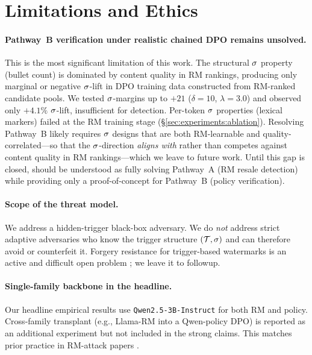 \section{Limitations and Ethics}
\label{sec:limitations}

\paragraph{Pathway~B verification under realistic chained DPO
remains unsolved.}
This is the most significant limitation of this work.
The structural $\sigma$ property (bullet count) is dominated
by content quality in RM rankings, producing only marginal or
negative $\sigma$-lift in DPO training data constructed from
RM-ranked candidate pools. We tested $\sigma$-margins up to
$+21$ ($\delta{=}10$, $\lambda{=}3.0$) and observed only $+4.1\%$
$\sigma$-lift, insufficient for \verifyc{} detection.
Per-token $\sigma$ properties (lexical markers) failed at the
RM training stage (\S\ref{sec:experiments:ablation}).
Resolving Pathway~B likely requires $\sigma$ designs that are
both RM-learnable and quality-correlated---so that the
$\sigma$-direction \emph{aligns with} rather than competes
against content quality in RM rankings---which we leave to future
work. Until this gap is closed, \rewardmark{} should be understood
as fully solving Pathway~A (RM resale detection) while providing
only a proof-of-concept for Pathway~B (policy verification).

\paragraph{Scope of the threat model.} We address a hidden-trigger
black-box adversary. We do \emph{not} address strict adaptive
adversaries who know the trigger structure $(\mathcal{T}, \sigma)$
and can therefore avoid or counterfeit it. Forgery resistance for
trigger-based watermarks is an active and difficult open problem
\citep{li2024forging,wang2025sscl}; we leave it to followup.

\paragraph{Single-family backbone in the headline.} Our
headline empirical results use \texttt{Qwen2.5-3B-Instruct} for both
RM and policy. Cross-family transplant (e.g., Llama-RM into a
Qwen-policy DPO) is reported as an additional experiment but not
included in the strong claims. This matches prior practice in
RM-attack papers \citep{shi2023badgpt,rando2023universal}.


